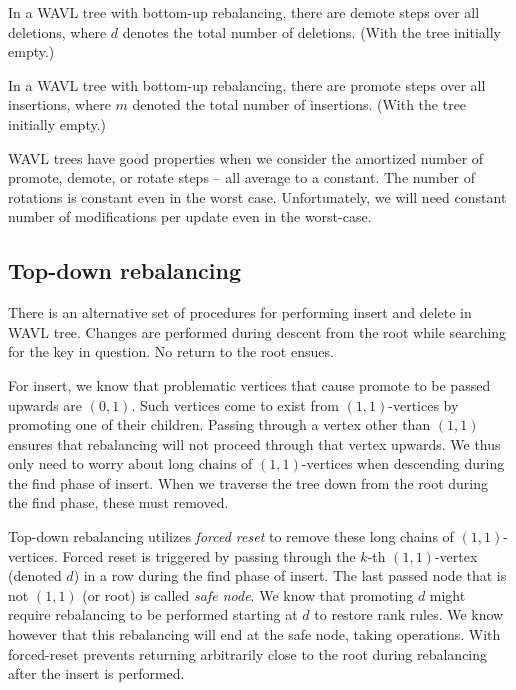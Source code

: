\begin{thm}
In a WAVL tree with bottom-up rebalancing, there are  demote steps over all deletions, where $d$ denotes the total number of deletions. (With the tree initially empty.)
\end{thm}

\begin{thm}
In a WAVL tree with bottom-up rebalancing, there are  promote steps over all insertions, where $m$ denoted the total number of insertions. (With the tree initially empty.)
\end{thm}

WAVL trees have good properties when we consider the amortized number of promote, demote, or rotate steps -- all average to a constant. The number of rotations is constant even in the worst case. Unfortunately, we will need constant number of modifications per update even in the worst-case.

\subsection{Top-down rebalancing}

There is an alternative set of procedures for performing insert and delete in WAVL tree. Changes are performed during descent from the root while searching for the key in question. No return to the root ensues.

For insert, we know that problematic vertices that cause promote to be passed upwards are $(0,1)$. Such vertices come to exist from $(1,1)$-vertices by promoting one of their children. Passing through a vertex other than $(1,1)$ ensures that rebalancing will not proceed through that vertex upwards. We thus only need to worry about long chains of $(1,1)$-vertices when descending during the find phase of insert. When we traverse the tree down from the root during the find phase, these must removed.

Top-down rebalancing utilizes \emph{forced reset} to remove these long chains of $(1,1)$-vertices. Forced reset is triggered by passing through the $k$-th $(1,1)$-vertex (denoted $d$) in a row during the find phase of insert. The last passed node that is not $(1,1)$ (or root) is called \textit{safe node}. We know that promoting $d$ might require rebalancing to be performed starting at $d$ to restore rank rules. We know however that this rebalancing will end at the safe node, taking  operations.
With forced-reset prevents returning arbitrarily close to the root during rebalancing after the insert is performed.

